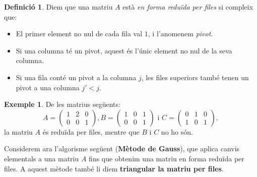 \documentclass[a4paper,12pt,twoside]{article}
\newcommand{\1}{\mathbf{1}}
\newcommand{\0}{\mathbf{0}}
\theoremstyle{definition}
\newtheorem{definicio}[teorema]{Definició}
\newtheorem{exemple}[teorema]{Exemple}
\theoremstyle{remark}
\begin{document}
\begin{definicio}
	Diem que una matriu $A$ està \emph{en forma reduïda per files} si compleix que:
	\begin{itemize}
		\item El primer element no nul de cada fila val $1$, i l'anomenem \emph{pivot}.
		\item Si una columna té un pivot, aquest és l'únic element no nul de la seva columna.
		\item Si una fila conté un pivot a la columna $j$, les files superiors també tenen un pivot a una columna $j'<j$.
	\end{itemize}
\end{definicio}
\begin{exemple}
	De les matrius següents:
	$$
	A=\begin{pmatrix}
	1 & 2 & 0 \\ 0 & 0 & 1
	\end{pmatrix},
	B=\begin{pmatrix}
	1 & 0 & 1 \\ 0 & 0 & 1
	\end{pmatrix} \text{ i }
	C=\begin{pmatrix}
	0 & 1 & 0 \\ 1 & 0 & 1
	\end{pmatrix} ,
	$$
	la matriu $A$ és reduïda per files, mentre que $B$ i $C$ no ho són.
\end{exemple}
Considerem ara l'algorisme següent (\textbf{Mètode de Gauss}), que aplica canvis elementals a una matriu $A$ fins que obtenim una matriu en forma reduïda per files. A aquest mètode també li diem \textbf{triangular la matriu per files}.
\end{document}
